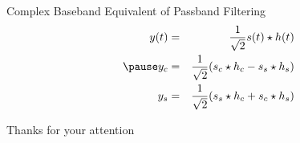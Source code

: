 \documentclass[t]{beamer}
\begin{document}
\begin{frame}{Complex Baseband Equivalent of Passband Filtering}
\begin{eqnarray*}
y(t) & = & \frac{1}{\sqrt{2}} s(t) \star h(t)\\
\pause
y_c  & = &\frac{1}{\sqrt{2}}(s_c\star h_c - s_s \star h_s) \\
y_s  & = & \frac{1}{\sqrt{2}}(s_s\star h_c + s_c \star h_s) 
\end{eqnarray*}
\end{frame}
\begin{frame}{}
\vfill
\begin{center}
Thanks for your attention
\end{center}
\vfill
\end{frame}
\end{document}
